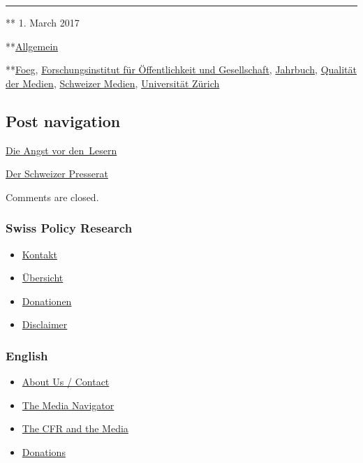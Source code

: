 \begin{center}\rule{0.5\linewidth}{\linethickness}\end{center}

** 1. March 2017

**\href{https://swprs.org/category/allgemein/}{Allgemein}

**\href{https://swprs.org/tag/foeg/}{Foeg},
\href{https://swprs.org/tag/forschungsinstitut-fuer-oeffentlichkeit-und-gesellschaft/}{Forschungsinstitut
für Öffentlichkeit und Gesellschaft},
\href{https://swprs.org/tag/jahrbuch/}{Jahrbuch},
\href{https://swprs.org/tag/qualitaet-der-medien/}{Qualität der Medien},
\href{https://swprs.org/tag/schweizer-medien/}{Schweizer Medien},
\href{https://swprs.org/tag/universitaet-zuerich/}{Universität Zürich}

\hypertarget{post-navigation}{%
\subsection{Post navigation}\label{post-navigation}}

\href{https://swprs.org/2017/03/01/leserkommentare/}{Die Angst vor
den~Lesern}

\href{https://swprs.org/2017/03/01/der-schweizer-presserat/}{Der
Schweizer Presserat}

Comments are closed.

\hypertarget{swiss-policy-research}{%
\subsubsection{Swiss Policy Research}\label{swiss-policy-research}}

\begin{itemize}
\tightlist
\item
  \href{https://swprs.org/kontakt/}{Kontakt}
\item
  \href{https://swprs.org/uebersicht/}{Übersicht}
\item
  \href{https://swprs.org/donationen/}{Donationen}
\item
  \href{https://swprs.org/disclaimer/}{Disclaimer}
\end{itemize}

\hypertarget{english}{%
\subsubsection{English}\label{english}}

\begin{itemize}
\tightlist
\item
  \href{https://swprs.org/contact/}{About Us / Contact}
\item
  \href{https://swprs.org/media-navigator/}{The Media Navigator}
\item
  \href{https://swprs.org/the-american-empire-and-its-media/}{The CFR
  and the Media}
\item
  \href{https://swprs.org/donations/}{Donations}
\end{itemize}

